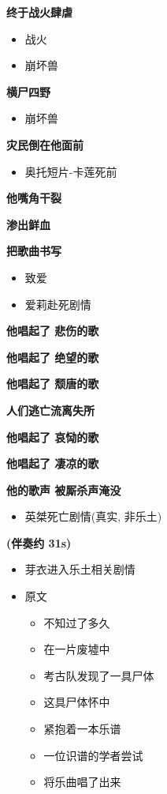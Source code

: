 \documentclass[a4paper]{article}
\begin{document}
\textbf{终于战火肆虐}

\begin{itemize}
    \item 战火
    \item 崩坏兽
\end{itemize}

\textbf{横尸四野}

\begin{itemize}
    \item 崩坏兽
\end{itemize}

\textbf{灾民倒在他面前}

\begin{itemize}
    \item 奥托短片-卡莲死前
\end{itemize}

\textbf{他嘴角干裂}

\textbf{渗出鲜血}

\textbf{把歌曲书写}

\begin{itemize}
    \item 致爱
    \item 爱莉赴死剧情
\end{itemize}

\textbf{他唱起了 悲伤的歌}

\textbf{他唱起了 绝望的歌}

\textbf{他唱起了 颓唐的歌}

\textbf{人们逃亡流离失所}

\textbf{他唱起了 哀恸的歌}

\textbf{他唱起了 凄凉的歌}

\textbf{他的歌声 被厮杀声淹没}

\begin{itemize}
    \item 英桀死亡剧情(真实, 非乐土)
\end{itemize}

\textbf{(伴奏约 31s)}

\begin{itemize}
    \item 芽衣进入乐土相关剧情
    \item 原文
    \begin{itemize}
        \item 不知过了多久
        \item 在一片废墟中
        \item 考古队发现了一具尸体
        \item 这具尸体怀中
        \item 紧抱着一本乐谱
        \item 一位识谱的学者尝试
        \item 将乐曲唱了出来
    \end{itemize}
\end{itemize}
\end{document}
